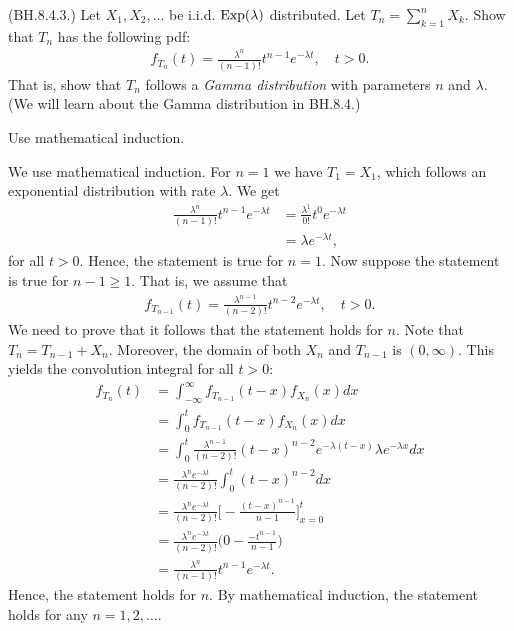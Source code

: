 \begin{exercise}
(BH.8.4.3.) Let $X_1, X_2, \ldots$ be i.i.d. $\mathrm{Exp}(\lambda)$ distributed. Let $T_n = \sum_{k=1}^n X_k$. Show that $T_n$ has the following pdf:
\begin{align}
    f_{T_n}(t) = \frac{\lambda^n}{(n-1)!} t^{n-1} e^{-\lambda t}, \quad t > 0.
\end{align}
That is, show that $T_n$ follows a \emph{Gamma distribution} with parameters $n$ and $\lambda$. (We will learn about the Gamma distribution in BH.8.4.)\\
\begin{hint}
Use mathematical induction.
\end{hint}

\begin{solution}
We use mathematical induction. For $n=1$ we have $T_1 = X_1$, which follows an exponential distribution with rate $\lambda$. We get
\begin{align}
    \frac{\lambda^n}{(n-1)!} t^{n-1} e^{-\lambda t} &= \frac{\lambda^1}{0!} t^{0} e^{-\lambda t}\\
    &= \lambda e^{-\lambda t},
\end{align}
for all $t>0$. Hence, the statement is true for $n=1$. Now suppose the statement is true for $n-1 \geq 1$. That is, we assume that
\begin{align}
    f_{T_{n-1}}(t) = \frac{\lambda^{n-1}}{(n-2)!} t^{n-2} e^{-\lambda t}, \quad t > 0.
\end{align}
We need to prove that it follows that the statement holds for $n$. Note that $T_n = T_{n-1} + X_n$. Moreover, the domain of both $X_n$ and $T_{n-1}$ is $(0,\infty)$. This yields the convolution integral for all $t>0$:
\begin{align}
    f_{T_n}(t) &= \int_{-\infty}^{\infty} f_{T_{n-1}}(t - x) f_{X_n}(x) dx \\
    &= \int_0^t f_{T_{n-1}}(t - x) f_{X_n}(x) dx \\
    &= \int_0^t \frac{\lambda^{n-1}}{(n-2)!} (t-x)^{n-2} e^{-\lambda (t-x)} \lambda e^{-\lambda x} dx \\
    &= \frac{\lambda^{n} e^{-\lambda t}}{(n-2)!} \int_0^t (t-x)^{n-2}  dx \\
    &= \frac{\lambda^{n} e^{-\lambda t}}{(n-2)!} \Bigg[ -\frac{(t - x)^{n-1}}{n-1} \Bigg]_{x=0}^t \\
    &= \frac{\lambda^{n} e^{-\lambda t}}{(n-2)!} \Bigg( 0 - \frac{-t^{n-1}}{n-1} \Bigg) \\
    &= \frac{\lambda^{n} }{(n-1)!} t^{n-1} e^{-\lambda t}.
\end{align}
Hence, the statement holds for $n$. By mathematical induction, the statement holds for any $n=1,2,\ldots$.
\end{solution}
\end{exercise}

